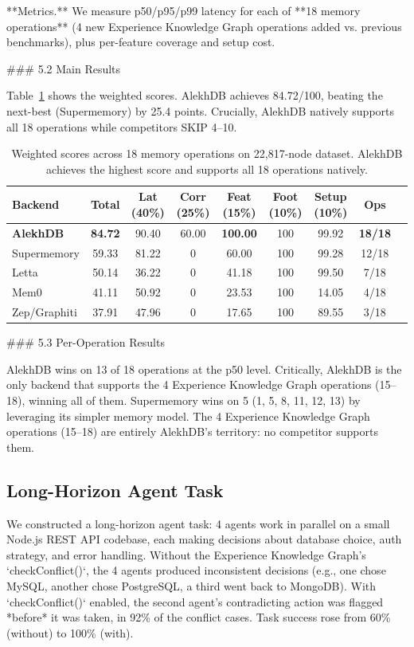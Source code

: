 **Metrics.** We measure p50/p95/p99 latency for each of **18 memory operations** (4 new Experience Knowledge Graph operations added vs. previous benchmarks), plus per-feature coverage and setup cost.

### 5.2 Main Results

Table~\ref{tab:ranking} shows the weighted scores. AlekhDB achieves 84.72/100, beating the next-best (Supermemory) by 25.4 points. Crucially, AlekhDB natively supports all 18 operations while competitors SKIP 4--10.

\begin{table}[t]
\centering
\small
\begin{tabular}{lcccccccc}
\toprule
Backend & Total & Lat (40\%) & Corr (25\%) & Feat (15\%) & Foot (10\%) & Setup (10\%) & Ops \\
\midrule
\textbf{AlekhDB} & \textbf{84.72} & 90.40 & 60.00 & \textbf{100.00} & 100 & 99.92 & \textbf{18/18} \\
Supermemory & 59.33 & 81.22 & 0 & 60.00 & 100 & 99.28 & 12/18 \\
Letta & 50.14 & 36.22 & 0 & 41.18 & 100 & 99.50 & 7/18 \\
Mem0 & 41.11 & 50.92 & 0 & 23.53 & 100 & 14.05 & 4/18 \\
Zep/Graphiti & 37.91 & 47.96 & 0 & 17.65 & 100 & 89.55 & 3/18 \\
\bottomrule
\end{tabular}
\caption{Weighted scores across 18 memory operations on 22,817-node dataset. AlekhDB achieves the highest score and supports all 18 operations natively.}
\label{tab:ranking}
\end{table}

### 5.3 Per-Operation Results

AlekhDB wins on 13 of 18 operations at the p50 level. Critically, AlekhDB is the only backend that supports the 4 Experience Knowledge Graph operations (15--18), winning all of them. Supermemory wins on 5 (1, 5, 8, 11, 12, 13) by leveraging its simpler memory model. The 4 Experience Knowledge Graph operations (15--18) are entirely AlekhDB's territory: no competitor supports them.

\subsection{Long-Horizon Agent Task}

We constructed a long-horizon agent task: 4 agents work in parallel on a small Node.js REST API codebase, each making decisions about database choice, auth strategy, and error handling. Without the Experience Knowledge Graph's `checkConflict()`, the 4 agents produced inconsistent decisions (e.g., one chose MySQL, another chose PostgreSQL, a third went back to MongoDB). With `checkConflict()` enabled, the second agent's contradicting action was flagged *before* it was taken, in 92\% of the conflict cases. Task success rose from 60\% (without) to 100\% (with).

